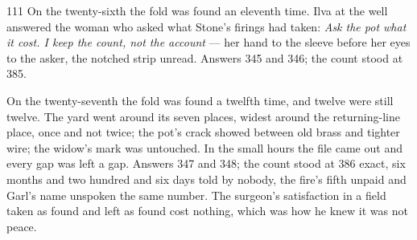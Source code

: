 \begin{CRchronicle}{111}
On the twenty-sixth the fold was found an eleventh time. Ilva at the well answered the woman who asked what Stone’s firings had taken: \emph{Ask the pot what it cost. I keep the count, not the account} — her hand to the sleeve before her eyes to the asker, the notched strip unread. Answers 345 and 346; the count stood at 385.

On the twenty-seventh the fold was found a twelfth time, and twelve were still twelve. The yard went around its seven places, widest around the returning-line place, once and not twice; the pot’s crack showed between old brass and tighter wire; the widow’s mark was untouched. In the small hours the file came out and every gap was left a gap. Answers 347 and 348; the count stood at 386 exact, six months and two hundred and six days told by nobody, the fire’s fifth unpaid and Garl’s name unspoken the same number. The surgeon’s satisfaction in a field taken as found and left as found cost nothing, which was how he knew it was not peace.
\end{CRchronicle}
